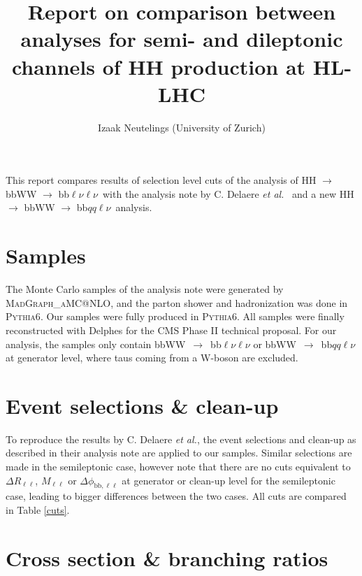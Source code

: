 \documentclass[10pt,a4paper]{article}
\title{Report on comparison between analyses for semi- and dileptonic channels of HH production at HL-LHC}
\author{Izaak Neutelings (University of Zurich)}
\newcommand{\di}{$\rightarrow$ bbWW $\rightarrow$ bb$\ell\nu \ell\nu$}
\newcommand{\semi}{$\rightarrow$ bbWW $\rightarrow$ bb$qq\ell\nu$}
\newcommand{\lnu}{$\ell\nu$}
\renewcommand{\ll}{\ell\ell}
\newcommand{\etal}{\emph{et al.}}
\begin{document}
\maketitle





This report compares results of selection level cuts of the analysis of HH \di\ with the analysis note by C. Delaere \etal\ \cite{AN} and a new HH \semi\ analysis.





\section{Samples}

The Monte Carlo samples of the analysis note were generated by \textsc{MadGraph\_aMC@NLO}, and the parton shower and hadronization was done in \textsc{Pythia6}. Our samples were fully produced in \textsc{Pythia6}. All samples were finally reconstructed with Delphes for the CMS Phase II technical proposal.
For our analysis, the samples only contain \mbox{bbWW $\rightarrow$ bb\lnu\lnu} or \mbox{bbWW $\rightarrow$ bb$qq$\lnu} at generator level, where taus coming from a W-boson are excluded. %





\section{Event selections \& clean-up}

To reproduce the results by C. Delaere \etal, the event selections and clean-up as described in their analysis note are applied to our samples. %
Similar selections are made in the semileptonic case, however note that there are no cuts equivalent to $\Delta R_{\ll}$, $M_{\ll}$ or $\Delta \phi_{\text{bb},\ll}$ at generator or clean-up level for the semileptonic case, leading to bigger differences between the two cases. All cuts are compared in Table \ref{cuts}.





\section{Cross section \& branching ratios}
\end{document}
